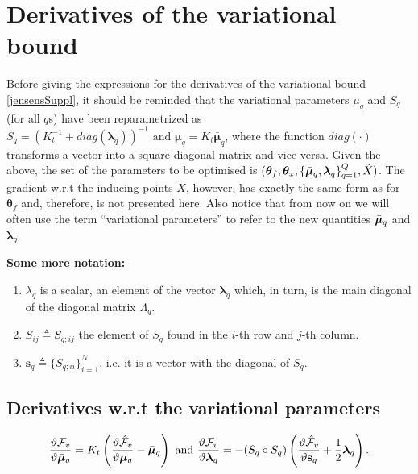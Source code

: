 
\section{Derivatives of the variational bound}
Before giving the expressions for the derivatives of the variational bound \eqref{jensensSuppl},
it should be reminded that the variational parameters $\mu_q$ and $S_q$ (for all $q$s) have been
reparametrized as $S_q = \left( \mathit{K}_t^{-1} + diag(\boldsymbol \lambda_q) \right)^{-1}  \text{ and }   \boldsymbol \mu_q = K_t \bar{\boldsymbol \mu}_q$, where the function $diag(\cdot)$ transforms a vector into a square diagonal matrix and vice versa. Given the above, the set of the parameters to be optimised is 
$( \boldsymbol \theta_f, \boldsymbol \theta_x, \{ \bar{\boldsymbol \mu}_q, \boldsymbol \lambda_q \}_{q=1}^Q, \tilde{X})$. The gradient w.r.t the inducing points $\tilde{X}$, however, has exactly the same form as for $\boldsymbol \theta_f$ and, therefore, is not presented here. Also notice that from now on we will often use the term ``variational parameters'' to refer to the new quantities $\bar{\boldsymbol \mu}_q$ and $\boldsymbol \lambda_q$. 

\textbf{Some more notation:} 
\begin{enumerate}
\item $\lambda_q$ is a scalar, an element of the vector $\boldsymbol \lambda_q$ which, in turn, is the main diagonal of the diagonal matrix $\Lambda_q$. 
\item $S_{ij} \triangleq S_{q;ij}$ the element of $S_q$ found in the $i$-th row and $j$-th column.
\item $\mathbf{s}_q \triangleq \lbrace S_{q;ii} \rbrace_{i=1}^N$, i.e. it is a vector with the diagonal of $S_q$.
\end{enumerate}

\subsection{Derivatives w.r.t the variational parameters}
\begin{equation}
    \label{derivVarParamSuppl}
\frac{\vartheta \mathcal{F}_v}{\vartheta \bar{\boldsymbol \mu}_q} 
=  K_t \left( \frac{\vartheta \hat{\mathcal{F}}_v}{\vartheta \boldsymbol \mu_q} - \bar{\boldsymbol \mu}_q \right)
\text{ and }
 \frac{\vartheta \mathcal{F}_v}{\vartheta \boldsymbol \lambda_q}
= - ( S_q \circ S_q) \left( \frac{\vartheta \hat{\mathcal{F}}_v}{\vartheta \mathbf{s}_q} + \frac{1}{2} \boldsymbol \lambda_q \right).
\end{equation}

